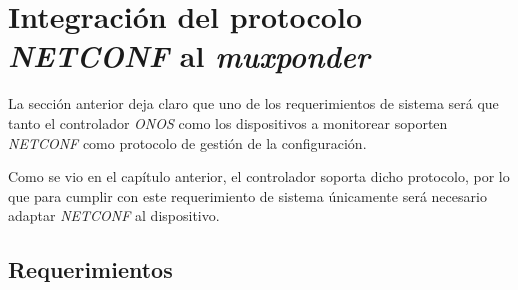 \newpage

  \section{Integración del protocolo \textit{NETCONF} al \textit{muxponder}}
  La sección anterior deja claro que uno de los requerimientos de sistema será que tanto el controlador \textit{ONOS} como los dispositivos a monitorear soporten \textit{NETCONF} como protocolo de gestión de la configuración. 
  
  Como se vio en el capítulo anterior, el controlador soporta dicho protocolo, por lo que para cumplir con este requerimiento de sistema únicamente será necesario adaptar \textit{NETCONF} al dispositivo. 
  

  \subsection{Requerimientos}

